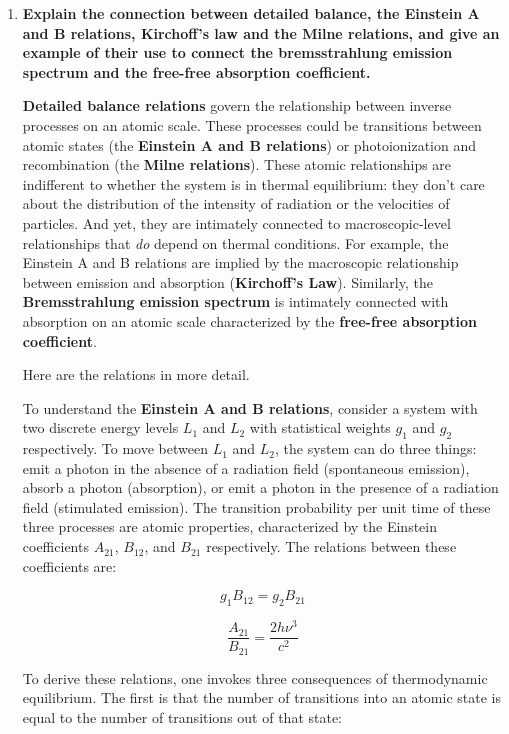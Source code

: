 \documentclass[12pt, letterpaper, preprint]{aastex}
\begin{document}
\begin{enumerate}
  \item \textbf{Explain the connection between detailed balance, 
    the Einstein A and B relations,
    Kirchoff's law and the Milne relations, 
    and give an example of their use to connect the
    bremsstrahlung emission spectrum and the free-free absorption coefficient.}
    
\textbf{Detailed balance relations} govern the relationship between inverse processes on an atomic scale.
These processes could be transitions between atomic states
(the \textbf{Einstein A and B relations})
or photoionization and recombination (the \textbf{Milne relations}).
These atomic relationships are indifferent to whether the system is in thermal equilibrium: they don't care about the distribution of the intensity of radiation or the velocities of particles.
And yet, they are intimately connected to macroscopic-level relationships that \emph{do} depend on thermal conditions.
For example, the Einstein A and B relations
are implied by the macroscopic relationship between
emission and absorption (\textbf{Kirchoff's Law}).
Similarly, the \textbf{Bremsstrahlung emission spectrum} 
is intimately connected with absorption on an atomic scale characterized by the \textbf{free-free absorption coefficient}.

Here are the relations in more detail.

To understand the \textbf{Einstein A and B relations},
consider a system with two discrete energy levels 
$L_1$ and $L_2$ with statistical weights $g_1$ and $g_2$ respectively. To move between $L_1$ and $L_2$, the system
can do three things: emit a photon in the absence of a radiation field (spontaneous emission), absorb a photon (absorption),
or emit a photon in the presence of a radiation field (stimulated emission). The transition probability per unit time of these three processes are atomic properties, characterized
by the Einstein coefficients $A_{21}$, $B_{12}$, and $B_{21}$ respectively. The relations between these coefficients are: 

\begin{equation}
  g_1 B_{12} = g_2 B_{21}
  \label{einstein-B}
\end{equation}

\begin{equation}
  \frac{A_{21}}{B_{21}} = \frac{2 h \nu^3}{c^2}
  \label{einstein-A}
\end{equation}

To derive these relations, one invokes three consequences of thermodynamic equilibrium. 
The first is that the number of transitions into an atomic state is equal to the number of transitions out of that state:


\end{enumerate}
\end{document}
